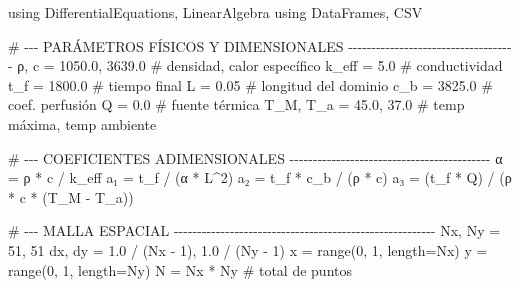 \documentclass[
  spanish,
  us-letterpaper,
  DIV=11,
  numbers=noendperiod]{scrreprt}
\newenvironment{Shaded}{\begin{snugshade}}{\end{snugshade}}
\newcommand{\BuiltInTok}[1]{\textcolor[rgb]{0.00,0.23,0.31}{#1}}
\newcommand{\CommentTok}[1]{\textcolor[rgb]{0.37,0.37,0.37}{#1}}
\newcommand{\FloatTok}[1]{\textcolor[rgb]{0.68,0.00,0.00}{#1}}
\newcommand{\FunctionTok}[1]{\textcolor[rgb]{0.28,0.35,0.67}{#1}}
\newcommand{\ImportTok}[1]{\textcolor[rgb]{0.00,0.46,0.62}{#1}}
\newcommand{\NormalTok}[1]{\textcolor[rgb]{0.00,0.23,0.31}{#1}}
\newcommand{\OperatorTok}[1]{\textcolor[rgb]{0.37,0.37,0.37}{#1}}
\theoremstyle{definition}
\theoremstyle{plain}
\theoremstyle{remark}
\begin{document}
\begin{Shaded}
\begin{Highlighting}[]
\ImportTok{using} \BuiltInTok{DifferentialEquations}\NormalTok{, }\BuiltInTok{LinearAlgebra}
\ImportTok{using} \BuiltInTok{DataFrames}\NormalTok{, }\BuiltInTok{CSV}

\CommentTok{\# {-}{-}{-} PARÁMETROS FÍSICOS Y DIMENSIONALES {-}{-}{-}{-}{-}{-}{-}{-}{-}{-}{-}{-}{-}{-}{-}{-}{-}{-}{-}{-}{-}{-}{-}{-}{-}{-}{-}{-}{-}{-}{-}{-}{-}{-}{-}{-}}
\NormalTok{ρ, c  }\OperatorTok{=} \FloatTok{1050.0}\NormalTok{, }\FloatTok{3639.0}                        \CommentTok{\# densidad, calor específico }
\NormalTok{k\_eff }\OperatorTok{=} \FloatTok{5.0}                                   \CommentTok{\# conductividad}
\NormalTok{t\_f   }\OperatorTok{=} \FloatTok{1800.0}                                \CommentTok{\# tiempo final }
\NormalTok{L     }\OperatorTok{=} \FloatTok{0.05}                                  \CommentTok{\# longitud del dominio}
\NormalTok{c\_b   }\OperatorTok{=} \FloatTok{3825.0}                                \CommentTok{\# coef. perfusión}
\NormalTok{Q     }\OperatorTok{=} \FloatTok{0.0}                                   \CommentTok{\# fuente térmica}
\NormalTok{T\_M, T\_a }\OperatorTok{=} \FloatTok{45.0}\NormalTok{, }\FloatTok{37.0}                         \CommentTok{\# temp máxima, temp ambiente}

\CommentTok{\# {-}{-}{-} COEFICIENTES ADIMENSIONALES {-}{-}{-}{-}{-}{-}{-}{-}{-}{-}{-}{-}{-}{-}{-}{-}{-}{-}{-}{-}{-}{-}{-}{-}{-}{-}{-}{-}{-}{-}{-}{-}{-}{-}{-}{-}{-}{-}{-}{-}{-}{-}{-}}
\NormalTok{α }\OperatorTok{=}\NormalTok{ ρ }\OperatorTok{*}\NormalTok{ c }\OperatorTok{/}\NormalTok{ k\_eff}
\NormalTok{a₁ }\OperatorTok{=}\NormalTok{ t\_f }\OperatorTok{/}\NormalTok{ (α }\OperatorTok{*}\NormalTok{ L}\OperatorTok{\^{}}\FloatTok{2}\NormalTok{)}
\NormalTok{a₂ }\OperatorTok{=}\NormalTok{ t\_f }\OperatorTok{*}\NormalTok{ c\_b }\OperatorTok{/}\NormalTok{ (ρ }\OperatorTok{*}\NormalTok{ c)}
\NormalTok{a₃ }\OperatorTok{=}\NormalTok{ (t\_f }\OperatorTok{*}\NormalTok{ Q) }\OperatorTok{/}\NormalTok{ (ρ }\OperatorTok{*}\NormalTok{ c }\OperatorTok{*}\NormalTok{ (T\_M }\OperatorTok{{-}}\NormalTok{ T\_a))}

\CommentTok{\# {-}{-}{-} MALLA ESPACIAL {-}{-}{-}{-}{-}{-}{-}{-}{-}{-}{-}{-}{-}{-}{-}{-}{-}{-}{-}{-}{-}{-}{-}{-}{-}{-}{-}{-}{-}{-}{-}{-}{-}{-}{-}{-}{-}{-}{-}{-}{-}{-}{-}{-}{-}{-}{-}{-}{-}{-}{-}{-}{-}{-}{-}{-}}
\NormalTok{Nx, Ny }\OperatorTok{=} \FloatTok{51}\NormalTok{, }\FloatTok{51}
\NormalTok{dx, dy }\OperatorTok{=} \FloatTok{1.0} \OperatorTok{/}\NormalTok{ (Nx }\OperatorTok{{-}} \FloatTok{1}\NormalTok{), }\FloatTok{1.0} \OperatorTok{/}\NormalTok{ (Ny }\OperatorTok{{-}} \FloatTok{1}\NormalTok{)}
\NormalTok{x }\OperatorTok{=} \FunctionTok{range}\NormalTok{(}\FloatTok{0}\NormalTok{, }\FloatTok{1}\NormalTok{, length}\OperatorTok{=}\NormalTok{Nx)}
\NormalTok{y }\OperatorTok{=} \FunctionTok{range}\NormalTok{(}\FloatTok{0}\NormalTok{, }\FloatTok{1}\NormalTok{, length}\OperatorTok{=}\NormalTok{Ny)}
\NormalTok{N }\OperatorTok{=}\NormalTok{ Nx }\OperatorTok{*}\NormalTok{ Ny  }\CommentTok{\# total de puntos}


\end{Highlighting}
\end{Shaded}
\end{document}
